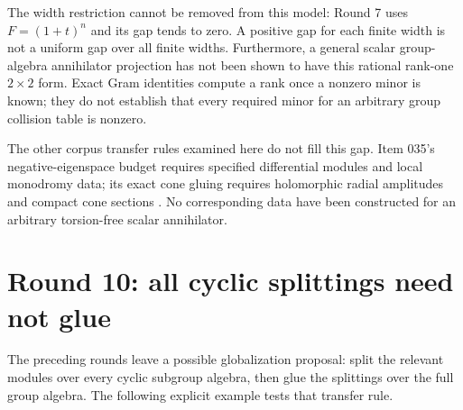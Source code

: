\documentclass[11pt,a4paper,oneside]{report}
\theoremstyle{definition}
\theoremstyle{remark}
\begin{document}
The width restriction cannot be removed from this model:
Round 7 uses $F=(1+t)^n$ and its gap tends to zero.
A positive gap for each finite width is not a uniform gap over
all finite widths. Furthermore, a general scalar group-algebra
annihilator projection has not been shown to have this rational
rank-one $2\times2$ form. Exact Gram identities compute a rank
once a nonzero minor is known; they do not establish that every
required minor for an arbitrary group collision table is nonzero.

The other corpus transfer rules examined here do not fill this
gap. Item 035's negative-eigenspace budget requires specified
differential modules and local monodromy data; its exact cone
gluing requires holomorphic radial amplitudes and compact cone
sections \cite{B:Corpus035}. No corresponding data have been
constructed for an arbitrary torsion-free scalar annihilator.

\section{Round 10: all cyclic splittings need not glue}
The preceding rounds leave a possible globalization proposal:
split the relevant modules over every cyclic subgroup algebra,
then glue the splittings over the full group algebra. The following
explicit example tests that transfer rule.
\end{document}
